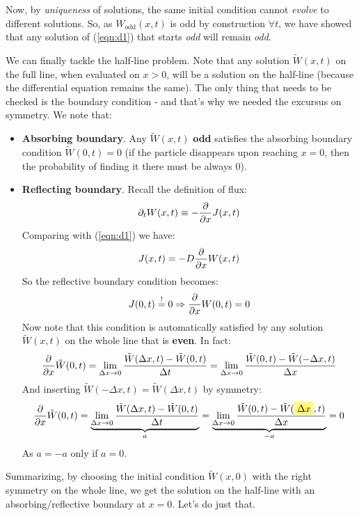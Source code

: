 \documentclass[../template.tex]{subfiles}
\begin{document}
\begin{exo}
    \begin{expl}
        Now, by \textit{uniqueness} of solutions, the same initial condition cannot \textit{evolve} to different solutions. So, as $W_{\mathrm{odd}}(x,t)$ is odd by construction $\forall t$, we have showed that any solution of (\ref{eqn:d1}) that starts \textit{odd} will remain \textit{odd}.  
    \end{expl}

    We can finally tackle the half-line problem. Note that any solution $\tilde{W}(x,t)$ on the full line, when evaluated on $x>0$, will be a solution on the half-line (because the differential equation remains the same). The only thing that needs to be checked is the boundary condition - and that's why we needed the excursus on symmetry. We note that:

    \begin{itemize}
        \item \textbf{Absorbing boundary}. Any $\tilde{W}(x,t)$ \textbf{odd} satisfies the absorbing boundary condition $\tilde{W}(0,t) = 0$ (if the particle disappears upon reaching $x=0$, then the probability of finding it there must be always $0$).
        \item \textbf{Reflecting boundary}. Recall the definition of flux:
        \begin{align*}
            \partial_t W(x,t) \equiv - \pdv{x} J(x,t)
        \end{align*}
        Comparing with (\ref{eqn:d1}) we have:
        \begin{align*}
            J(x,t) = -D \pdv{x}W(x,t)
        \end{align*}
        So the reflective boundary condition becomes:
        \begin{align*}
            J(0,t) \overset{!}{=} 0 \Rightarrow \pdv{x} W(0,t) = 0
        \end{align*}
        Now note that this condition is automatically satisfied by any solution $\tilde{W}(x,t)$ on the whole line that is \textbf{even}. In fact:
        \begin{align*}
            \pdv{x} \tilde{W}(0,t) = \lim_{\Delta x \to 0} \frac{\tilde{W}(\Delta x,t) - \tilde{W}(0,t)}{\Delta t} = \lim_{\Delta x \to 0} \frac{\tilde{W}(0,t) - \tilde{W}(-\Delta x,t)}{\Delta x}  
        \end{align*} 
        And inserting $\tilde{W}(-\Delta x,t) = \tilde{W}(\Delta x,t)$ by symmetry:
        \begin{align*}
            \pdv{x} \tilde{W}(0,t) =  \underbrace{\lim_{\Delta x \to 0} \frac{\tilde{W}(\Delta x,t) - \tilde{W}(0,t)}{\Delta t} }_{a}= \underbrace{\lim_{\Delta x \to 0} \frac{\tilde{W}(0,t) - \tilde{W}(\hlc{Yellow}{\Delta x},t)}{\Delta x} }_{-a}= 0
        \end{align*}
        As $a=-a$ only if $a=0$.
    \end{itemize}
    Summarizing, by choosing the initial condition $\tilde{W}(x,0)$ with the right symmetry on the whole line, we get  the solution on the half-line with an absorbing/reflective boundary at $x=0$. Let's do just that.


\end{exo}
\end{document}

